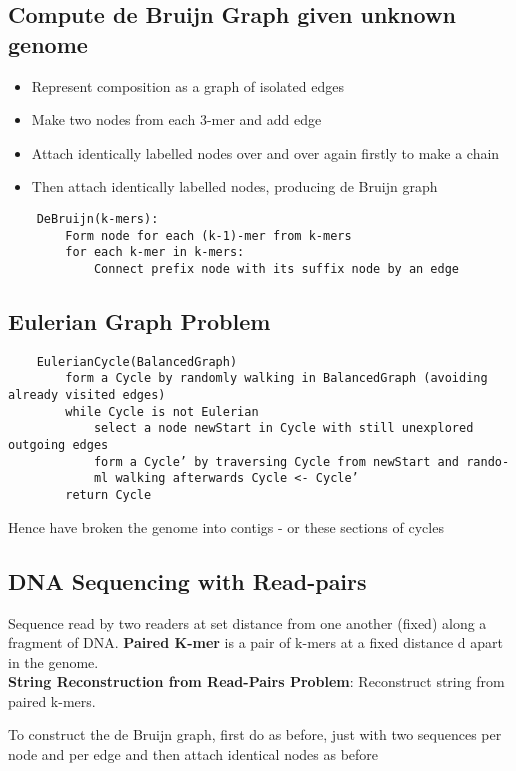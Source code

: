\documentclass{article}
\begin{document}
\subsection{Compute de Bruijn Graph given unknown genome}
\begin{itemize}
    \item Represent composition as a graph of isolated edges
    \item Make two nodes from each 3-mer and add edge
    \item Attach identically labelled nodes over and over again firstly to make a chain
    \item Then attach identically labelled nodes, producing de Bruijn graph
\end{itemize}
    
\begin{verbatim}
    DeBruijn(k-mers):
        Form node for each (k-1)-mer from k-mers
        for each k-mer in k-mers:
            Connect prefix node with its suffix node by an edge
\end{verbatim}

\subsection{Eulerian Graph Problem}
\begin{verbatim}
    EulerianCycle(BalancedGraph)
        form a Cycle by randomly walking in BalancedGraph (avoiding already visited edges)
        while Cycle is not Eulerian
            select a node newStart in Cycle with still unexplored outgoing edges
            form a Cycle’ by traversing Cycle from newStart and rando-
            ml walking afterwards Cycle <- Cycle’
        return Cycle
\end{verbatim}

Hence have broken the genome into contigs - or these sections of cycles

\subsection{DNA Sequencing with Read-pairs}
Sequence read by two readers at set distance from one another (fixed) along a fragment of DNA. \textbf{Paired K-mer} is a pair of k-mers at a fixed distance d apart in the genome.\\

\noindent
\textbf{String Reconstruction from Read-Pairs Problem}: Reconstruct string from paired k-mers.

To construct the de Bruijn graph, first do as before, just with two sequences per node and per edge and then attach identical nodes as before
\end{document}
